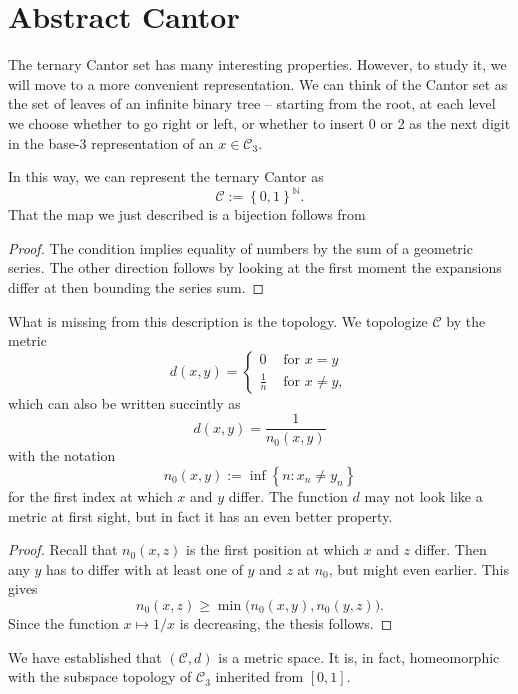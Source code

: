 \section{Abstract Cantor}

The ternary Cantor set has many interesting properties. However, to study it, we will move to a more convenient representation. We can think of the Cantor set as the set of leaves of an infinite binary tree -- starting from the root, at each level we choose whether to go right or left, or whether to insert 0 or 2 as the next digit in the base-3 representation of an \( x \in \mathcal{C}_3 \).

In this way, we can represent the ternary Cantor as
\[ 
  \mathcal{C} := \left\{ 0,1  \right\}^{ \mathbb{N} }.
\]
That the map we just described is a bijection follows from
\begin{proof}
The condition implies equality of numbers by the sum of a geometric series. The other direction follows by looking at the first moment the expansions differ at then bounding the series sum.
\end{proof}

What is missing from this description is the topology. We topologize \( \mathcal{C} \) by the metric
\[ 
    d(x,y) = 
    \begin{cases}
        0 &\text{ for } x = y \\
        \frac{1}{n}&\text{ for } x \neq y,
   \end{cases}
\]
which can also be written succintly as
\[ 
    d(x,y) = \frac{1}{n_0(x,y)}
\]
with the notation
\[ 
    n_0(x,y) := \inf \left\{ n: x_n \neq y_n \right\} 
\]
for the first index at which \( x \) and \( y \) differ. The function \( d \) may not look like a metric at first sight, but in fact it has an even better property.
\begin{proof}
    Recall that \( n_0(x,z) \) is the first position at which \( x \) and \( z \) differ. Then any \( y \) has to differ with at least one of \( y \) and \( z \) at \( n_0 \), but might even earlier. This gives
    \[ 
       n_0(x,z) \geqslant \min \bigl( n_0(x,y), n_0(y,z) \bigr).
   \]
   Since the function \( x \mapsto 1/x \) is decreasing, the thesis follows.
\end{proof}
We have established that \( ( \mathcal{C}, d ) \) is a metric space. It is, in fact, homeomorphic with the subspace topology of \( \mathcal{C}_3 \) inherited from \( [0,1] \).

